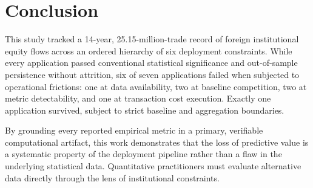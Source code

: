 \documentclass{ieeeaccess}
\begin{document}
\section{Conclusion}
\label{sec:conclusion}
This study tracked a 14-year, 25.15-million-trade record of foreign institutional equity flows across an ordered hierarchy of six deployment constraints. While every application passed conventional statistical significance and out-of-sample persistence without attrition, six of seven applications failed when subjected to operational frictions: one at data availability, two at baseline competition, two at metric detectability, and one at transaction cost execution. Exactly one application survived, subject to strict baseline and aggregation boundaries.

By grounding every reported empirical metric in a primary, verifiable computational artifact, this work demonstrates that the loss of predictive value is a systematic property of the deployment pipeline rather than a flaw in the underlying statistical data. Quantitative practitioners must evaluate alternative data directly through the lens of institutional constraints.

\appendices
\end{document}
